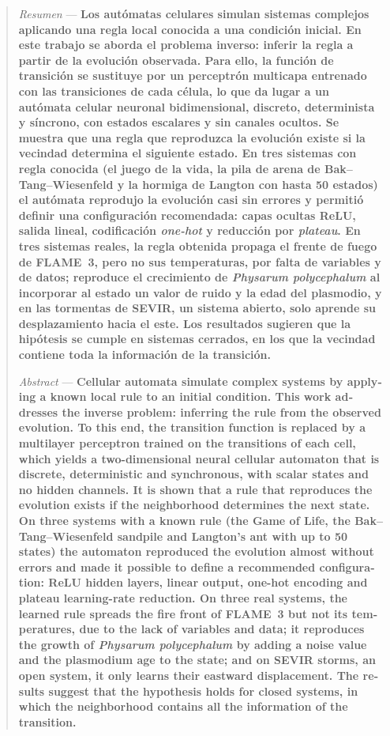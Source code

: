 \begin{abstract}
	\noindent \textit{Resumen} --- \textbf{Los autómatas celulares simulan sistemas complejos aplicando una regla local conocida a una condición inicial. En este trabajo se aborda el problema inverso: inferir la regla a partir de la evolución observada. Para ello, la función de transición se sustituye por un perceptrón multicapa entrenado con las transiciones de cada célula, lo que da lugar a un autómata celular neuronal bidimensional, discreto, determinista y síncrono, con estados escalares y sin canales ocultos. Se muestra que una regla que reproduzca la evolución existe si la vecindad determina el siguiente estado. En tres sistemas con regla conocida (el juego de la vida, la pila de arena de Bak–Tang–Wiesenfeld y la hormiga de Langton con hasta 50 estados) el autómata reprodujo la evolución casi sin errores y permitió definir una configuración recomendada: capas ocultas ReLU, salida lineal, codificación \textit{one-hot} y reducción por \textit{plateau}. En tres sistemas reales, la regla obtenida propaga el frente de fuego de FLAME~3, pero no sus temperaturas, por falta de variables y de datos; reproduce el crecimiento de \textit{Physarum polycephalum} al incorporar al estado un valor de ruido y la edad del plasmodio, y en las tormentas de SEVIR, un sistema abierto, solo aprende su desplazamiento hacia el este. Los resultados sugieren que la hipótesis se cumple en sistemas cerrados, en los que la vecindad contiene toda la información de la transición.}

	\vspace{0.8em}
	\begin{otherlanguage}{english}
	\noindent \textit{Abstract} --- \textbf{Cellular automata simulate complex systems by applying a known local rule to an initial condition. This work addresses the inverse problem: inferring the rule from the observed evolution. To this end, the transition function is replaced by a multilayer perceptron trained on the transitions of each cell, which yields a two-dimensional neural cellular automaton that is discrete, deterministic and synchronous, with scalar states and no hidden channels. It is shown that a rule that reproduces the evolution exists if the neighborhood determines the next state. On three systems with a known rule (the Game of Life, the Bak–Tang–Wiesenfeld sandpile and Langton's ant with up to 50 states) the automaton reproduced the evolution almost without errors and made it possible to define a recommended configuration: ReLU hidden layers, linear output, one-hot encoding and plateau learning-rate reduction. On three real systems, the learned rule spreads the fire front of FLAME~3 but not its temperatures, due to the lack of variables and data; it reproduces the growth of \textit{Physarum polycephalum} by adding a noise value and the plasmodium age to the state; and on SEVIR storms, an open system, it only learns their eastward displacement. The results suggest that the hypothesis holds for closed systems, in which the neighborhood contains all the information of the transition.}
	\end{otherlanguage}


\end{abstract}
